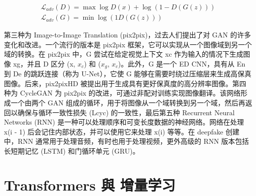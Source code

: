 $$
\begin{gathered}
\mathcal{L}_{a d v}(D)=\max \log D(x)+\log (1-D(G(z))) \\
\mathcal{L}_{a d v}(G)=\min \log (1 D(G(z)))
\end{gathered}
$$

第三种为 Image-to-Image Translation (pix2pix)，过去人们提出了对 GAN 的许多变化和改进。一个流行的版本是 pix2pix 框架，它可以实现从一个图像域到另一个域的转换。在 pix2pix 中，G 尝试在给定视觉上下文 xc 作为输入的情况下生成图像 xg，并且 D 区分 (x, $x_c$) 和 ($x_g$, $x_c$)。此外，G 是一个 ED CNN，具有从 En 到 De 的跳跃连接（称为 U-Net），它使 G 能够在需要时绕过压缩层来生成高保真图像。后来，pix2pixHD 被提出用于生成具有更好保真度的高分辨率图像。第四种为 CycleGAN 为 pix2pix 的改进，可通过非配对训练实现图像翻译。该网络形成一个由两个 GAN 组成的循环，用于将图像从一个域转换到另一个域，然后再返回以确保与循环一致性损失 (Lcyc) 的一致性，最后第五种 Recurrent Neural Networks (RNN) 是一种可以处理顺序和可变长度数据的神经网络。网络在处理 x(i - 1) 后会记住内部状态，并可以使用它来处理 x(i) 等等。在 deepfake 创建中，RNN 通常用于处理音频，有时也用于处理视频，更外高级的 RNN 版本包括长短期记忆 (LSTM) 和门循环单元 (GRU)。



\section{Transformers 與 增量学习}



